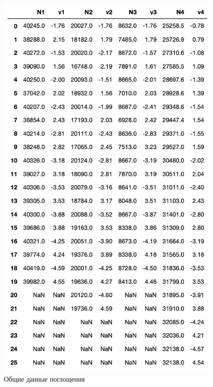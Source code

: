 \documentclass[a4paper]{article}
\begin{document}
\begin{figure}[H]
    \begin{center}
        \includegraphics[scale = 0.5]{data.png}
        \caption{Общие данные поглощения}
        \label{data}
    \end{center}
\end{figure}
\end{document}

